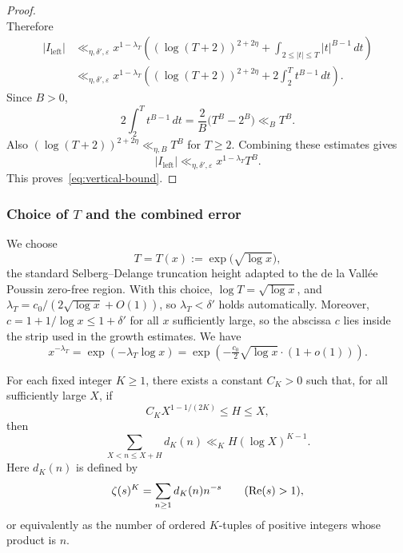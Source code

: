 \begin{proof}
\[\]
Therefore
\[
\begin{aligned}
    |I_{\mathrm{left}}|
    &\ll_{\eta,\delta',\varepsilon}
    x^{1-\lambda_T}
    \left(
        (\log(T+2))^{2+2\eta}
        + \int_{2\leq |t|\leq T}|t|^{B-1}\,dt
    \right) \\
    &\ll_{\eta,\delta',\varepsilon}
    x^{1-\lambda_T}
    \left(
        (\log(T+2))^{2+2\eta}
        + 2\int_2^T t^{B-1}\,dt
    \right).
\end{aligned}
\]
Since $B>0$,
\[
    2\int_2^T t^{B-1}\,dt
    = \frac{2}{B}\bigl(T^B-2^B\bigr)
    \ll_B T^B.
\]
Also $(\log(T+2))^{2+2\eta}\ll_{\eta,B}T^B$ for $T\geq2$.
Combining these estimates gives
\[
    |I_{\mathrm{left}}|
    \ll_{\eta,\delta',\varepsilon}
    x^{1-\lambda_T}T^B.
\]
This proves~\eqref{eq:vertical-bound}.
\end{proof}

\subsubsection*{Choice of $T$ and the combined error}

We choose
\begin{equation}\label{eq:T-choice}
    T = T(x) := \exp\bigl(\sqrt{\log x}\bigr),
\end{equation}
the standard Selberg--Delange truncation height adapted to the
de la Vall\'ee Poussin zero-free region. With this choice,
$\log T = \sqrt{\log x}$, and
$\lambda_T = c_0/(2\sqrt{\log x} + O(1))$, so $\lambda_T < \delta'$
holds automatically. Moreover, $c = 1 + 1/\log x \leq 1 + \delta'$
for all $x$ sufficiently large, so the abscissa $c$ lies inside
the strip used in the growth estimates. We have
\begin{equation}\label{eq:x-decay}
    x^{- \lambda_T}
    = \exp(- \lambda_T \log x)
    = \exp\left(- \tfrac{c_0}{2} \sqrt{\log x} \cdot (1 + o(1))\right).
\end{equation}

\begin{lemma}\label{lem:short-interval-dK}
For each fixed integer $K\geq1$, there exists a constant $C_K>0$
such that, for all sufficiently large $X$, if
\[
    C_K X^{1-1/(2K)}\leq H\leq X,
\]
then
\[
    \sum_{X<n\leq X+H} d_K(n)
    \ll_K H(\log X)^{K-1}.
\]
Here $d_K(n)$ is defined by
\[
    \zeta(s)^K=\sum_{n\geq1}d_K(n)n^{-s}
    \qquad (\operatorname{Re}(s)>1),
\]
or equivalently as the number of ordered $K$-tuples of positive
integers whose product is $n$.
\end{lemma}

